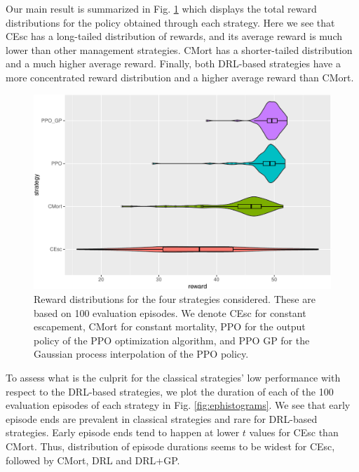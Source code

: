 \documentclass{article}
\begin{document}
Our main result is summarized in Fig. \ref{fig:main} which displays the
total reward distributions for the policy obtained through each
strategy. Here we see that CEsc has a long-tailed distribution of
rewards, and its average reward is much lower than other management
strategies. CMort has a shorter-tailed distribution and a much higher
average reward. Finally, both DRL-based strategies have a more
concentrated reward distribution and a higher average reward than CMort.

\begin{figure}
\includegraphics[width=6in]{manuscript_files/figure-latex/main-1} \caption{Reward distributions for the four strategies considered. These are based on 100 evaluation episodes. We denote CEsc for constant escapement, CMort for constant mortality, PPO for the output policy of the PPO optimization algorithm, and PPO GP for the Gaussian process interpolation of the PPO policy.}\label{fig:main}
\end{figure}

To assess what is the culprit for the classical strategies' low
performance with respect to the DRL-based strategies, we plot the
duration of each of the 100 evaluation episodes of each strategy in Fig.
\ref{fig:ephistograms}. We see that early episode ends are prevalent in
classical strategies and rare for DRL-based strategies. Early episode
ends tend to happen at lower \(t\) values for CEsc than CMort. Thus,
distribution of episode durations seems to be widest for CEsc, followed
by CMort, DRL and DRL+GP.
\end{document}
